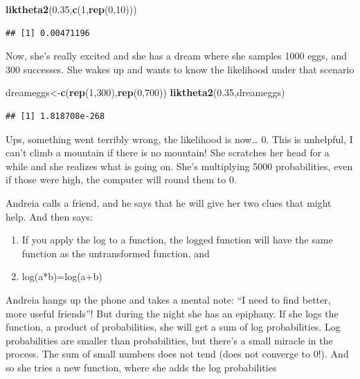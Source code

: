 \documentclass[
]{book}
\newenvironment{Shaded}{\begin{snugshade}}{\end{snugshade}}
\newcommand{\DecValTok}[1]{\textcolor[rgb]{0.00,0.00,0.81}{#1}}
\newcommand{\FloatTok}[1]{\textcolor[rgb]{0.00,0.00,0.81}{#1}}
\newcommand{\KeywordTok}[1]{\textcolor[rgb]{0.13,0.29,0.53}{\textbf{#1}}}
\newcommand{\NormalTok}[1]{#1}
\begin{document}
\begin{Shaded}
\begin{Highlighting}[]
\KeywordTok{liktheta2}\NormalTok{(}\FloatTok{0.35}\NormalTok{,}\KeywordTok{c}\NormalTok{(}\DecValTok{1}\NormalTok{,}\KeywordTok{rep}\NormalTok{(}\DecValTok{0}\NormalTok{,}\DecValTok{10}\NormalTok{)))}
\end{Highlighting}
\end{Shaded}

\begin{verbatim}
## [1] 0.00471196
\end{verbatim}

Now, she's really excited and she has a dream where she samples 1000 eggs, and 300 successes. She wakes up and wants to know the likelihood under that scenario

\begin{Shaded}
\begin{Highlighting}[]
\NormalTok{dreameggs<-}\KeywordTok{c}\NormalTok{(}\KeywordTok{rep}\NormalTok{(}\DecValTok{1}\NormalTok{,}\DecValTok{300}\NormalTok{),}\KeywordTok{rep}\NormalTok{(}\DecValTok{0}\NormalTok{,}\DecValTok{700}\NormalTok{))}
\KeywordTok{liktheta2}\NormalTok{(}\FloatTok{0.35}\NormalTok{,dreameggs)}
\end{Highlighting}
\end{Shaded}

\begin{verbatim}
## [1] 1.818708e-268
\end{verbatim}

Ups, something went terribly wrong, the likelihood is now\ldots{} 0. This is unhelpful, I can't climb a mountain if there is no mountain! She scratches her head for a while and she realizes what is going on. She's multiplying 5000 probabilities, even if those were high, the computer will round them to 0.

Andreia calls a friend, and he says that he will give her two clues that might help. And then says:

\begin{enumerate}
\def\labelenumi{\arabic{enumi}.}
\item
  If you apply the log to a function, the logged function will have the same function as the untransformed function, and
\item
  log(a*b)=log(a+b)
\end{enumerate}

Andreia hangs up the phone and takes a mental note: ``I need to find better, more useful friends''! But during the night she has an epiphany. If she logs the function, a product of probabilities, she will get a sum of log probabilities. Log probabilities are smaller than probabilities, but there's a small miracle in the process. The sum of small numbers does not tend (does not converge to 0!). And so she tries a new function, where she adds the log probabilities
\end{document}
